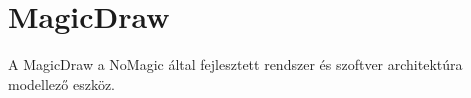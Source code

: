\chapter{MagicDraw}

A MagicDraw a NoMagic által fejlesztett rendszer és szoftver architektúra modellező eszköz. 